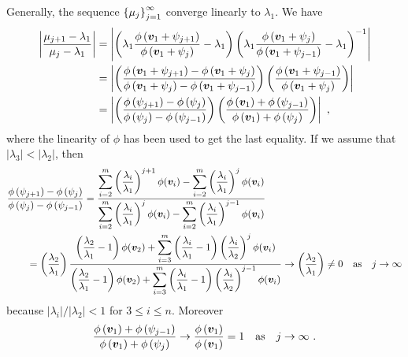 Generally, the sequence $\displaystyle \left\{ \mu_j \right\}_{j=1}^\infty$
converge linearly to $\lambda_1$.  We have
\begin{align*}
\left| \frac{\mu_{j+1}-\lambda_1}{\mu_j-\lambda_1} \right|
&=\left|\left(\lambda_1 \frac{\phi\left(\VEC{v}_1+\psi_{j+1}\right)}
{\phi\left(\VEC{v}_1+\psi_j\right)} - \lambda_1 \right)
\left(\lambda_1\frac{\phi\left(\VEC{v}_1+\psi_{j}\right)}
{\phi\left(\VEC{v}_1+\psi_{j-1}\right)} - \lambda_1 \right)^{-1}\right| \\
&=\left| \left(\frac{\phi\left(\VEC{v}_1+\psi_{j+1}\right)
-\phi\left(\VEC{v}_1+\psi_j\right)}
{\phi\left(\VEC{v}_1+\psi_{j}\right) -
\phi\left(\VEC{v}_1+\psi_{j-1}\right)}\right)
\left( \frac{\phi\left(\VEC{v}_1+\psi_{j-1}\right)}
{\phi\left(\VEC{v}_1+\psi_{j}\right)} \right)\right|\\
&=\left| \left(\frac{\phi\left(\psi_{j+1}\right)-\phi\left(\psi_j\right)}
{\phi\left(\psi_{j}\right)-\phi\left(\psi_{j-1}\right)}\right)
\left( \frac{\phi\left(\VEC{v}_1\right)+\phi\left(\psi_{j-1}\right)}
{\phi\left(\VEC{v}_1\right)+\phi\left(\psi_{j}\right)} \right)\right| \ ,
\end{align*}
where the linearity of $\phi$ has been used to get the last equality.
If we assume that $|\lambda_3|< |\lambda_2|$, then
\begin{align*}
&\frac{\phi\left(\psi_{j+1}\right)-\phi\left(\psi_j\right)}
{\phi\left(\psi_{j}\right)-\phi\left(\psi_{j-1}\right)}
= \frac{\displaystyle \sum_{i=2}^m
\left(\frac{\lambda_i}{\lambda_1}\right)^{j+1} \phi(\bm{v}_i)
-\sum_{i=2}^m \left(\frac{\lambda_i}{\lambda_1}\right)^j \phi(\bm{v}_i)}
{\displaystyle \sum_{i=2}^m
\left(\frac{\lambda_i}{\lambda_1}\right)^j \phi(\bm{v}_i)
-\sum_{i=2}^m \left(\frac{\lambda_i}{\lambda_1}\right)^{j-1} \phi(\bm{v}_i)} \\
&\qquad =\left(\frac{\lambda_2}{\lambda_1}\right)
\frac{\displaystyle \left(\frac{\lambda_2}{\lambda_1} - 1\right)
\phi(\bm{v}_2) +\sum_{i=3}^m \left(\frac{\lambda_i}{\lambda_1} - 1\right)
\left(\frac{\lambda_i}{\lambda_2}\right)^j \phi(\bm{v}_i)}
{\displaystyle \left(\frac{\lambda_2}{\lambda_1}-1\right)
\phi(\bm{v}_2) +\sum_{i=3}^m \left(\frac{\lambda_i}{\lambda_1} - 1\right)
\left(\frac{\lambda_i}{\lambda_2}\right)^{j-1} \phi(\bm{v}_i)}
\rightarrow \left(\frac{\lambda_2}{\lambda_1}\right) \neq 0
\quad \text{as} \quad j\rightarrow \infty
\end{align*}
because $|\lambda_i|/|\lambda_2| <1 $ for
$3\leq i \leq n$.  Moreover
\[
\frac{\phi\left(\bm{v}_1\right)+\phi\left(\psi_{j-1}\right)}
{\phi\left(\bm{v}_1\right)+\phi\left(\psi_{j}\right)}
\rightarrow \frac{\phi\left(\bm{v}_1\right)}
{\phi\left(\bm{v}_1\right)}=1 \quad \text{as} \quad
j \rightarrow \infty \ .
\]
